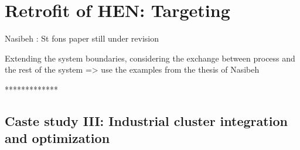 \section{Retrofit of HEN: Targeting}

Nasibeh : St fons paper still under revision

Extending the system boundaries, considering the exchange between process and the rest of the system => use the examples from the thesis of Nasibeh

*************

\subsection{Caste study III: Industrial cluster integration and optimization}